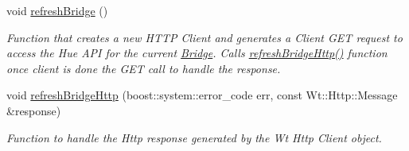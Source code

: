 \begin{DoxyCompactItemize}
void \hyperlink{classLightManagementWidget_a6d10a493cf2189f9a949c12828b499c2}{refresh\+Bridge} ()
\begin{DoxyCompactList}\small\item\em Function that creates a new H\+T\+TP Client and generates a Client G\+ET request to access the Hue A\+PI for the current \hyperlink{classBridge}{Bridge}. Calls \hyperlink{classLightManagementWidget_aef0c2a180f37b97769e39a52a9fce257}{refresh\+Bridge\+Http()} function once client is done the G\+ET call to handle the response. \end{DoxyCompactList}\item 
void \hyperlink{classLightManagementWidget_aef0c2a180f37b97769e39a52a9fce257}{refresh\+Bridge\+Http} (boost\+::system\+::error\+\_\+code err, const Wt\+::\+Http\+::\+Message \&response)
\begin{DoxyCompactList}\small\item\em Function to handle the Http response generated by the Wt Http Client object. \end{DoxyCompactList}\end{DoxyCompactItemize}
